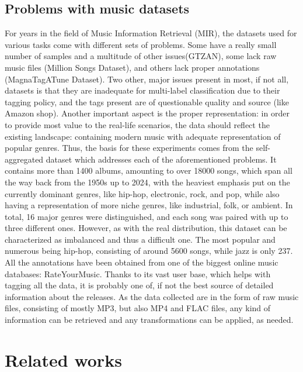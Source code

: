 \documentclass[runningheads]{llncs}
\begin{document}
\subsection{Problems with music datasets}
For years in the field of Music Information Retrieval (MIR), the datasets used for various tasks come with different sets of problems. Some have a really small number of samples and a multitude of other issues\cite{gtzan_analysis}(GTZAN\cite{gtzan}), some lack raw music files (Million Songs Dataset\cite{million}), and others lack proper annotations (MagnaTagATune Dataset). Two other, major issues present in most, if not all, datasets is that they are inadequate for multi-label classification due to their tagging policy, and the tags present are of questionable quality and source (like Amazon shop). Another important aspect is the proper representation: in order to provide most value to the real-life scenarios, the data should reflect the existing landscape: containing modern music with adequate representation of popular genres. Thus, the basis for these experiments comes from the self-aggregated dataset which addresses each of the aforementioned problems. It contains more than 1400 albums, amounting to over 18000 songs, which span all the way back from the 1950s up to 2024, with the heaviest emphasis put on the currently dominant genres, like hip-hop, electronic, rock, and pop, while also having a representation of more niche genres, like industrial, folk, or ambient. In total, 16 major genres were distinguished, and each song was paired with up to three different ones. However, as with the real distribution, this dataset can be characterized as imbalanced and thus a difficult one. The most popular and numerous being hip-hop, consisting of around 5600 songs, while jazz is only 237. All the annotations have been obtained from one of the biggest online music databases: RateYourMusic. Thanks to its vast user base, which helps with tagging all the data, it is probably one of, if not the best source of detailed information about the releases. As the data collected are in the form of raw music files, consisting of mostly MP3, but also MP4 and FLAC files, any kind of information can be retrieved and any transformations can be applied, as needed. 

\section{Related works}
\end{document}
